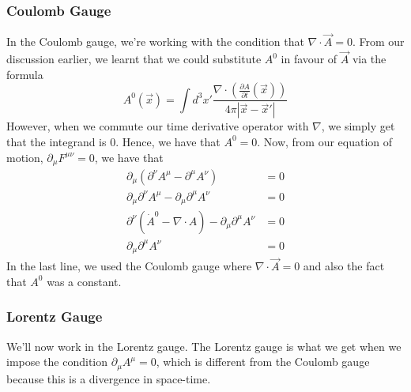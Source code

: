 \subsubsection{Coulomb Gauge}
In the Coulomb gauge, we're working with 
the condition that $ \nabla \cdot  \vec{A} =  0 $. 
From our discussion earlier, we 
learnt that we could substitute $ A ^ 0 $ in 
favour of  $ \vec{A} $ via the formula 
\[
	A ^ 0 (\vec{x} ) = \int d ^ 3 x' \frac{\nabla  \cdot \left(\frac{\partial  A }{ \partial  t } \left( \vec{x}  \right)    \right)  }{ 4 \pi | \vec{x} - \vec{x} ' | }
\] However, when we commute our time derivative 
operator with $ \nabla $, we simply get that 
the integrand is 0. Hence, we have that $ A ^ 0  = 0 $. 
Now, from our equation of motion, $ \partial  _ \mu F ^{ \mu \nu }  =0 $, 
we have that 
\begin{align*}
	\partial  _ \mu \left( \partial  ^ \nu A ^ \mu  - \partial  ^  \mu A ^ \nu  \right) &=  0  \\
	\partial  _ \mu \partial  ^ \nu A ^ \mu  - \partial  _ \mu \partial  ^ \mu A ^ \nu &=  0  \\ 
	\partial  ^ \nu \left( \dot{ A } ^ 0  - \nabla \cdot  A  \right)  - \partial  _ \mu \partial  ^ \mu A ^ \nu &=  0  \\ 
	\partial  _ \mu \partial  ^ \mu A^ \nu  &=  0  
\end{align*}
In the last line, we used the Coulomb gauge where $ \nabla \cdot  \vec{A} = 0 $ 
and also the fact that $ A ^ 0 $ was a constant. 

\subsubsection{Lorentz Gauge} 
We'll now work in the Lorentz gauge. 
The Lorentz gauge is what we get when we 
impose the condition $ \partial _ \mu A ^ \mu  = 0 $, 
which is different from the Coulomb gauge 
because this is a divergence in space-time.


